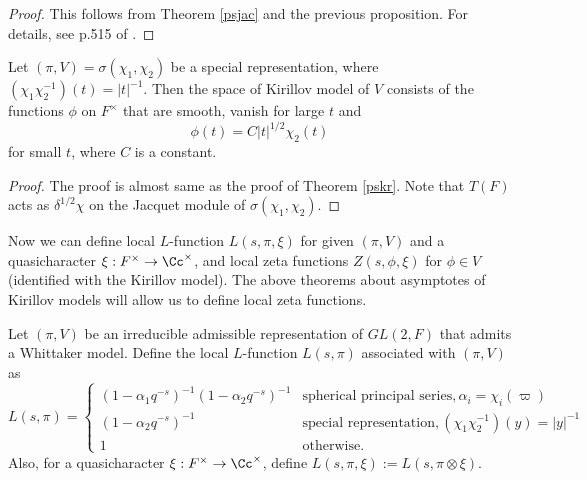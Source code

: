 \begin{proof}
This follows from Theorem \ref{psjac} and the previous proposition. For details, see p.515 of \cite{bu}. 
\end{proof}
\begin{theorem}
\label{spkr}
Let $(\pi, V) = \sigma(\chi_1, \chi_2)$ be a special representation, where $(\chi_1\chi_2^{-1})(t) = |t|^{-1}$.  Then the space of Kirillov model of $V$ consists of the functions $\phi$ on $F^{\times}$ that are smooth, vanish for large $t$ and $$\phi(t) = C|t|^{1/2}\chi_{2}(t)$$ for small $t$, where $C$ is a constant. 
\end{theorem}
\begin{proof}
The proof is almost same as the proof of Theorem \ref{pskr}. Note that $T(F)$ acts as $\delta^{1/2}\chi$ on the Jacquet module of $\sigma(\chi_1, \chi_2)$. 
\end{proof}

Now we can define local $L$-function $L(s, \pi, \xi)$ for given $(\pi, V)$ and a quasicharacter $\xi:F^\times \to\Cc^{\times}$, and local zeta functions $Z(s, \phi, \xi)$ for $\phi\in V$ (identified with the Kirillov model). 
The above theorems about asymptotes of Kirillov models will allow us to define local zeta functions. 
\begin{definition}
Let $(\pi, V)$ be an irreducible admissible representation of $GL(2, F)$ that admits a Whittaker model.
Define the local $L$-function $L(s, \pi)$ associated with $(\pi, V)$ as
$$
L(s, \pi) = \begin{cases} (1-\alpha_1 q^{-s})^{-1}(1-\alpha_2 q^{-s})^{-1} & \text{spherical principal series}, \alpha_i = \chi_i(\varpi) \\
(1-\alpha_{2} q^{-s})^{-1} & \text{special representation}, (\chi_{1}\chi_{2}^{-1})(y) = |y|^{-1} \\
1 &  \text{otherwise.}\end{cases}
$$
Also, for a quasicharacter $\xi:F^{\times} \to \Cc^{\times}$, define $L(s, \pi, \xi):= L(s, \pi\otimes \xi)$. 
\end{definition}

